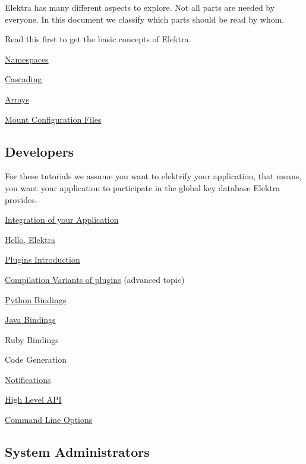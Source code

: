 Elektra has many different aspects to explore. Not all parts are needed by everyone. In this document we classify which parts should be read by whom.

Read this first to get the basic concepts of Elektra.


\begin{DoxyItemize}
\item \hyperlink{doc_tutorials_namespaces_md}{Namespaces}
\item \hyperlink{doc_tutorials_cascading_md}{Cascading}
\item \hyperlink{doc_tutorials_arrays_md}{Arrays}
\item \hyperlink{doc_tutorials_mount_md}{Mount Configuration Files}
\end{DoxyItemize}

\subsection*{Developers}

For these tutorials we assume you want to elektrify your application, that means, you want your application to participate in the global key database Elektra provides.


\begin{DoxyItemize}
\item \hyperlink{doc_tutorials_application-integration_md}{Integration of your Application}
\item \hyperlink{doc_tutorials_hello-elektra_md}{Hello, Elektra}
\item \hyperlink{doc_tutorials_plugins_md}{Plugins Introduction}
\item \hyperlink{doc_tutorials_compilation-variants_md}{Compilation Variants of plugins} (advanced topic)
\item \hyperlink{doc_tutorials_python-kdb_md}{Python Bindings}
\item \hyperlink{doc_tutorials_java-kdb_md}{Java Bindings}
\item Ruby Bindings
\item Code Generation
\item \hyperlink{doc_tutorials_notifications_md}{Notifications}
\item \hyperlink{src_libs_highlevel_README_md}{High Level A\+PI}
\item \hyperlink{doc_tutorials_command-line-options_md}{Command Line Options}
\end{DoxyItemize}

\subsection*{System Administrators}

